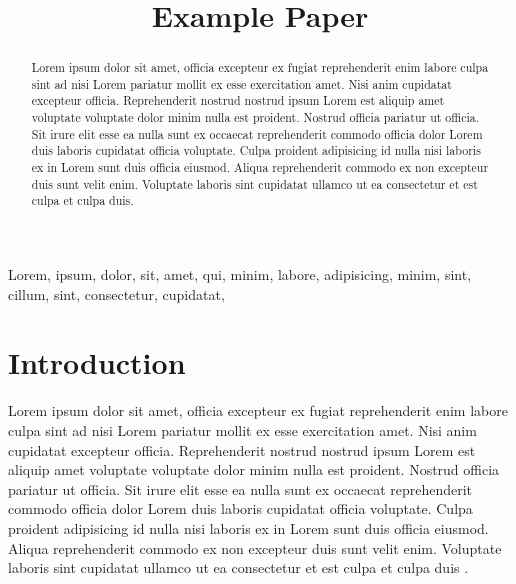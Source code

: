\documentclass[conference]{IEEEtran}
\begin{document}
\title{Example Paper}

\author{
}

\maketitle

\begin{IEEEkeywords}
  Lorem, ipsum, dolor, sit, amet, qui, minim, labore, adipisicing, minim, sint, cillum, sint, consectetur, cupidatat,
\end{IEEEkeywords}

\begin{abstract}
  Lorem ipsum dolor sit amet, officia excepteur ex fugiat reprehenderit enim labore culpa sint ad nisi Lorem pariatur mollit ex esse exercitation amet. Nisi anim cupidatat excepteur officia. Reprehenderit nostrud nostrud ipsum Lorem est aliquip amet voluptate voluptate dolor minim nulla est proident. Nostrud officia pariatur ut officia. Sit irure elit esse ea nulla sunt ex occaecat reprehenderit commodo officia dolor Lorem duis laboris cupidatat officia voluptate. Culpa proident adipisicing id nulla nisi laboris ex in Lorem sunt duis officia eiusmod. Aliqua reprehenderit commodo ex non excepteur duis sunt velit enim. Voluptate laboris sint cupidatat ullamco ut ea consectetur et est culpa et culpa duis.
\end{abstract}


\section{Introduction}
Lorem ipsum dolor sit amet, officia excepteur ex fugiat reprehenderit enim labore culpa sint ad nisi Lorem pariatur mollit ex esse exercitation amet. Nisi anim cupidatat excepteur officia. Reprehenderit nostrud nostrud ipsum Lorem est aliquip amet voluptate voluptate dolor minim nulla est proident. Nostrud officia pariatur ut officia. Sit irure elit esse ea nulla sunt ex occaecat reprehenderit commodo officia dolor Lorem duis laboris cupidatat officia voluptate. Culpa proident adipisicing id nulla nisi laboris ex in Lorem sunt duis officia eiusmod. Aliqua reprehenderit commodo ex non excepteur duis sunt velit enim. Voluptate laboris sint cupidatat ullamco ut ea consectetur et est culpa et culpa duis \cite{sun1090mhz}.
\end{document}
